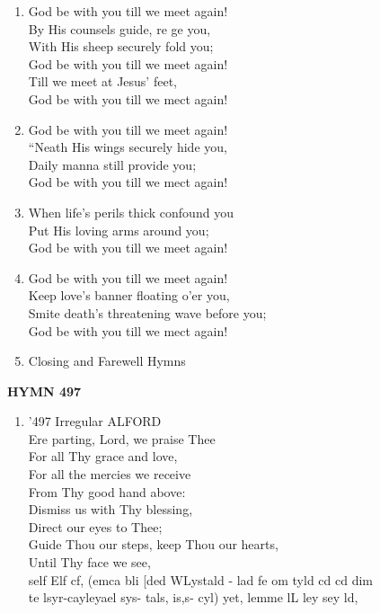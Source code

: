 \documentclass[11pt,a4paper]{article}
\begin{document}
\begin{enumerate}
    \item God be with you till we meet again! \\
        By His counsels guide, re ge you, \\
        With His sheep securely fold you; \\
        God be with you till we meet again! \\
        Till we meet at Jesus' feet, \\
        God be with you till we mect again!

    \item God be with you till we meet again! \\
        ``Neath His wings securely hide you, \\
        Daily manna still provide you; \\
        God be with you till we mect again!

    \item When life's perils thick confound you \\
        Put His loving arms around you; \\
        God be with you till we meet again!

    \item God be with you till we meet again! \\
        Keep love's banner floating o'er you, \\
        Smite death's threatening wave before you; \\
        God be with you till we mect again!

    \item Closing and Farewell Hymns

\end{enumerate}

\newpage
\begin{center}
    {\Large \textbf{HYMN 497}}
\end{center}
\vspace{1em}

\begin{enumerate}
    \item '497 Irregular ALFORD \\
        Ere parting, Lord, we praise Thee \\
        For all Thy grace and love, \\
        For all the mercies we receive \\
        From Thy good hand above: \\
        Dismiss us with Thy blessing, \\
        Direct our eyes to Thee; \\
        Guide Thou our steps, keep Thou our hearts, \\
        Until Thy face we see, \\
        self Elf cf, (emca bli [ded WLystald - lad fe om tyld cd cd dim \\
        te lsyr-cayleyael sys- tals, is,s- cyl) yet, lemme lL ley sey ld,

\end{enumerate}
\end{document}
